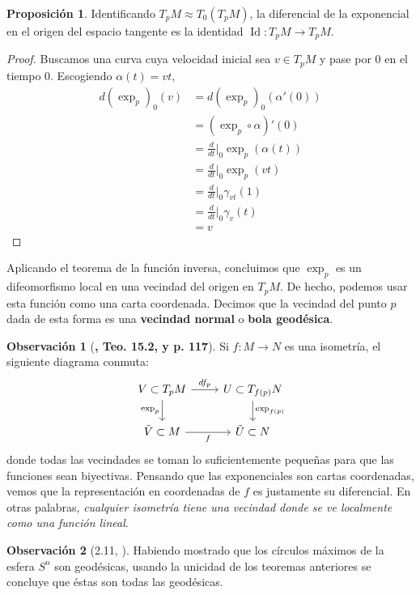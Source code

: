 \documentclass[spanish]{book}
\theoremstyle{definition}
\newtheorem*{prop}{Proposición}
\newtheorem*{obs}{Observación}
\DeclareMathOperator{\Id}{Id}
\begin{document}
	\begin{prop}
		Identificando $T_pM\approx T_0(T_pM)$, la diferencial de la exponencial en el origen del espacio tangente es la identidad $\Id:T_pM\to T_pM$.
	\end{prop}
	\begin{proof}
		Buscamos una curva cuya velocidad inicial sea $v\in T_pM$ y pase por $0$ en el tiempo $0$. Escogiendo $\alpha(t)=vt$,
		\begin{align*}
			d(\exp_p)_0(v)&=d(\exp_p)_0(\alpha'(0))\\
			&=(\exp_p\circ\alpha)'(0)\\
			&=\frac{d}{dt}\Big|_0\exp_p(\alpha(t))\\
			&=\frac{d}{dt}\Big|_0\exp_p(vt)\\
			&=\frac{d}{dt}\Big|_0\gamma_{vt}(1)\\
			&=\frac{d}{dt}\Big|_0\gamma_v(t)\\
			&=v
		\end{align*}
	\end{proof}
	
	Aplicando el teorema de la función inversa, concluimos que $\exp_p$ es un difeomorfismo local en una vecindad del origen en $T_pM$. De hecho, podemos usar esta función como una carta coordenada. Decimos que la vecindad del punto $p$ dada de esta forma es una \textbf{vecindad normal} o \textbf{bola geodésica}.
	
	\begin{obs}[\cite{Loring-dif}\textbf{, Teo. 15.2, y p. 117}]
		Si $f:M\to N$ es una isometría, el siguiente diagrama conmuta:
		\[\begin{tikzcd}
			V\subset T_pM\arrow{r}{df_p}\arrow[swap]{d}{\exp_p}&U\subset T_{f(p)}N\arrow{d}{\exp_{f(p)}}\\
			\tilde{V}\subset M\arrow[swap]{r}{f}&\tilde{U}\subset N
		\end{tikzcd}\]
		donde todas las vecindades se toman lo suficientemente pequeñas para que las funciones sean biyectivas. Pensando que las exponenciales son cartas coordenadas, vemos que la representación en coordenadas de $f$ es justamente su diferencial. En otras palabras, \textit{cualquier isometría tiene una vecindad donde se ve localmente como una función lineal}.
	\end{obs}
	
	\begin{obs}[2.11, \cite{DoCarmo}]
		Habiendo mostrado que los círculos máximos de la esfera $S^n$ son geodésicas, usando la unicidad de los teoremas anteriores se concluye que éstas son todas las geodésicas.
	\end{obs}
	
\end{document}
